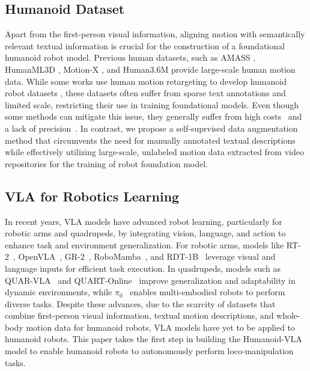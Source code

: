 \subsection{Humanoid Dataset}
Apart from the first-person visual information, aligning motion with semantically relevant textual information is crucial for the construction of a foundational humanoid robot model.
Previous human datasets, such as AMASS \citep{mahmood2019amass},  HumanML3D \citep{Guo_2022_CVPR}, Motion-X \citep{lin2023motion}, and Human3.6M \citep{h36m_pami, IonescuSminchisescu11} provide large-scale human motion data. While some works use human motion retargeting to develop humanoid robot datasets \citep{he2024omnih2o, he2024learning, cheng2024expressive, ji2024exbody2}, these datasets often suffer from sparse text annotations and limited scale, restricting their use in training foundational models. 
Even though some methods can mitigate this issue, they generally suffer from high costs~\cite{mao2024learning} and a lack of precision~\cite{tevet2023human}.
In contrast, we propose a self-suprvised data augmentation method that circumvents the need for manually
annotated textual descriptions while effectively utilizing
large-scale, unlabeled motion data extracted from video repositories for the training of robot foundation model.

\subsection{VLA for Robotics Learning}

In recent years, VLA models have advanced robot learning, particularly for robotic arms and quadrupeds, by integrating vision, language, and action to enhance task and environment generalization. For robotic arms, models like RT-2~\cite{brohan2023rt}, OpenVLA~\cite{kim2024openvla}, GR-2~\cite{cheang2024gr}, RoboMamba~\cite{liurobomamba}, and RDT-1B~\cite{liu2024rdt} leverage visual and language inputs for efficient task execution. In quadrupeds, models such as QUAR-VLA~\cite{ding2025quar} and QUART-Online~\cite{tong2024quart} improve generalization and adaptability in dynamic environments, while $\pi_0$~\cite{black2024pi_0} enables multi-embodied robots to perform diverse tasks. Despite these advances, due to the scarcity of datasets that combine first-person visual information, textual motion descriptions, and whole-body motion data for humanoid robots, VLA models have yet to be applied to humanoid robots. This paper takes the first step in building the Humanoid-VLA model to enable humanoid robots to autonomously perform loco-manipulation tasks.






